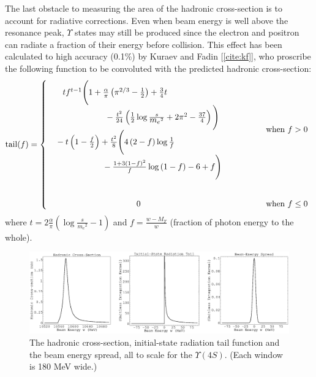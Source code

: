 \documentclass[12pt]{article}
\def\yivs{$\Upsilon(4S)$}
\begin{document}
The last obstacle to measuring the area of the hadronic cross-section
is to account for radiative corrections. Even when beam energy is well
above the resonance peak, $\Upsilon$ states may still be produced
since the electron and positron can radiate a fraction of their energy
before collision. This effect has been calculated to high accuracy
(0.1\%) by Kuraev and Fadin [\ref{cite:kf}], who proscribe the
following function to be convoluted with the predicted hadronic
cross-section:
\begin{equation}
  \mbox{tail}(f) = \left\{
  \begin{array}{c c l}
    \begin{array}{c}
      t f^{t-1} \Bigg(1 + \frac{\alpha}{\pi} \left(\pi^{2/3} - \frac{1}{2}\right) + \frac{3}{4} t \hspace{2cm} \\
      \hspace{2cm} \mbox{} - \frac{t^2}{24} \left(\frac{1}{2} \log \frac{s}{\mbox{$m_e$}^2} + 2\pi^2 - \frac{37}{4} \right) \Bigg) \\
      \mbox{} - t \left(1 - \frac{f}{2}\right) + \frac{t^2}{8} \Bigg(4 \left(2 - f\right) \log \frac{1}{f} \hspace{2cm} \\
      \hspace{2cm} \mbox{} - \frac{1 + 3\left(1 - f\right)^2}{f} \log \left(1 - f\right) - 6 + f\Bigg) \\
    \end{array} & \hspace{1cm} & \mbox{when } f > 0 \\
    & & \\
    & & \\
    0 & & \mbox{when } f \le 0
  \end{array}
  \right.
  \label{eq:kf}
\end{equation}
where $\displaystyle t = 2 \frac{\alpha}{\pi} \left( \log
\frac{s}{\mbox{$m_e$}^2} - 1 \right)$ and $f =
\frac{w-\mbox{$M_\Upsilon$}}{w}$ (fraction of photon energy to the
whole).

\vspace{5mm}

\begin{figure}[t]
  \begin{center}
    \includegraphics[width=\linewidth]{three_functions.eps}
  \end{center}

  \caption{The hadronic cross-section, initial-state radiation tail
  function and the beam energy spread, all to scale for the \yivs.
  (Each window is 180 MeV wide.)}

  \label{fig:3func}
\end{figure}
\end{document}
